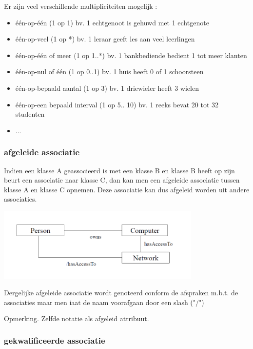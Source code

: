 Er zijn veel verschillende multipliciteiten mogelijk :

\begin{itemize}
    \item één-op-één (1 op 1)
bv. 1 echtgenoot is gehuwd met 1 echtgenote
    \item één-op-veel (1 op *)
bv. 1 leraar geeft les aan veel leerlingen
    \item één-op-één of meer (1 op 1..*)
bv. 1 bankbediende bedient 1 tot meer klanten
    \item één-op-nul of één (1 op 0..1)
bv. 1 huis heeft 0 of 1 schoorsteen
\item één-op-bepaald aantal (1 op 3) bv. 1 driewieler heeft 3 wielen
    \item één-op-een bepaald interval (1 op 5.. 10) bv. 1 reeks bevat 20 tot 32 studenten
    \item ...
\end{itemize}

\subsubsection{afgeleide associatie}

Indien een klasse A geassocieerd is met een klasse B en klasse B heeft op zijn beurt een associatie naar klasse C, dan kan men een afgeleide associatie tussen klasse A en klasse C opnemen. Deze associatie kan dus afgeleid worden uit andere associaties.


\begin{center}
\includegraphics[width=4in]{img/dera1}%
\end{center}

Dergelijke afgeleide associatie wordt genoteerd conform de afspraken m.b.t. de associaties maar men iaat de naam voorafgaan door een slash ("/")

Opmerking. Zelfde notatie als afgeleid attribuut.

\subsubsection{gekwalificeerde associatie}

